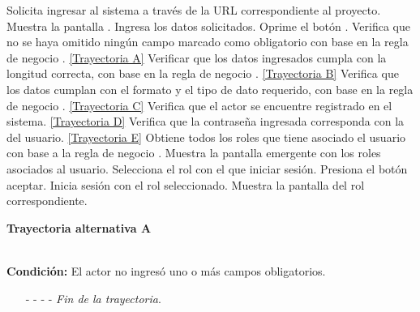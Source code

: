 	\begin{UCtrayectoria}
		\UCpaso[\UCactor] Solicita ingresar al sistema a través de la URL correspondiente al proyecto.
		\UCpaso[\UCsist] Muestra la pantalla .
		\UCpaso[\UCactor] Ingresa los datos solicitados. \label{P3}
		\UCpaso[\UCactor] Oprime el botón .
		\UCpaso[\UCsist] Verifica que no se haya omitido ningún campo marcado como obligatorio con base en la regla de negocio . \hyperlink{CU1:TAA}{[Trayectoria A]}
		\UCpaso[\UCsist] Verificar que los datos ingresados cumpla con la longitud correcta, con base en la regla de negocio . \hyperlink{CU1:TAB}{[Trayectoria B]}
		\UCpaso[\UCsist] Verifica que los datos cumplan con el formato y el tipo de dato requerido, con base en la regla de negocio . \hyperlink{CU1:TAC}{[Trayectoria C]}
		\UCpaso[\UCsist] Verifica que el actor se encuentre registrado en el sistema. \hyperlink{CU1:TAD}{[Trayectoria D]}
		\UCpaso[\UCsist] Verifica que la contraseña ingresada corresponda con la del usuario. \hyperlink{CU1:TAE}{[Trayectoria E]}
		\UCpaso[\UCsist] Obtiene todos los roles que tiene asociado el usuario con base a la regla de negocio .
		\UCpaso[\UCsist] Muestra la pantalla emergente  con los roles asociados al usuario.
		\UCpaso[\UCactor] Selecciona el rol con el que iniciar sesión.
		\UCpaso[\UCactor] Presiona el botón aceptar.
		\UCpaso[\UCsist] Inicia sesión con el rol seleccionado.
		\UCpaso[\UCsist] Muestra la pantalla del rol correspondiente.
	\end{UCtrayectoria}		
		\hypertarget{CU1:TAA}{\textbf{Trayectoria alternativa A}}\\
		\noindent \textbf{Condición:} El actor no ingresó uno o más campos obligatorios.
		\begin{enumerate}
			\UCpaso[\UCsist] Muestra el mensaje  y señala el campo que presenta el error en la pantalla .
			\UCpaso[\UCactor] Regresa al paso \ref{P3} de la Trayectoria Principal.
			\item[- -] - - {\em {Fin de la trayectoria}}.%
		\end{enumerate}



